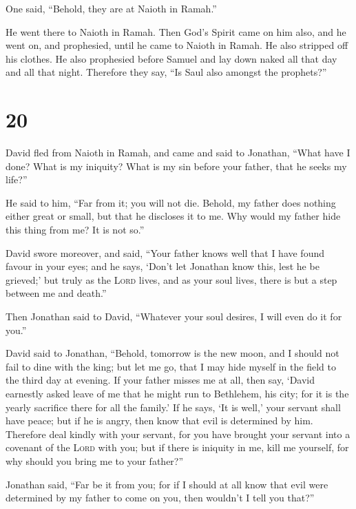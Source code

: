 One said, ``Behold, they are at Naioth in Ramah.''

 He went there to Naioth in Ramah. Then God's Spirit came
on him also, and he went on, and prophesied, until he came to Naioth in
Ramah.  He also stripped off his clothes. He also
prophesied before Samuel and lay down naked all that day and all that
night. Therefore they say, ``Is Saul also amongst the prophets?''

\hypertarget{section-19}{%
\section{20}\label{section-19}}

 David fled from Naioth in Ramah, and came and said to
Jonathan, ``What have I done? What is my iniquity? What is my sin before
your father, that he seeks my life?''

 He said to him, ``Far from it; you will not die. Behold,
my father does nothing either great or small, but that he discloses it
to me. Why would my father hide this thing from me? It is not so.''

 David swore moreover, and said, ``Your father knows well
that I have found favour in your eyes; and he says, `Don't let Jonathan
know this, lest he be grieved;' but truly as the \textsc{Lord} lives,
and as your soul lives, there is but a step between me and death.''

 Then Jonathan said to David, ``Whatever your soul
desires, I will even do it for you.''

 David said to Jonathan, ``Behold, tomorrow is the new
moon, and I should not fail to dine with the king; but let me go, that I
may hide myself in the field to the third day at evening. 
If your father misses me at all, then say, `David earnestly asked leave
of me that he might run to Bethlehem, his city; for it is the yearly
sacrifice there for all the family.'  If he says, `It is
well,' your servant shall have peace; but if he is angry, then know that
evil is determined by him.  Therefore deal kindly with
your servant, for you have brought your servant into a covenant of the
\textsc{Lord} with you; but if there is iniquity in me, kill me
yourself, for why should you bring me to your father?''

 Jonathan said, ``Far be it from you; for if I should at
all know that evil were determined by my father to come on you, then
wouldn't I tell you that?''

